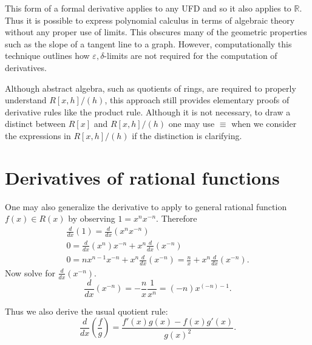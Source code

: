 \documentclass[12pt]{article}
\begin{document}
This form of a formal derivative applies to any UFD and so it also applies to $\mathbb{R}$.  Thus it is possible to express polynomial calculus in terms of algebraic theory without any proper use of limits.  This obscures many of the geometric properties such as the slope of a tangent line to a graph.  However, computationally this technique outlines how $\varepsilon,\delta$-limits are not required for the computation of derivatives.  

Although abstract algebra, such as quotients of rings, are required to properly understand $R[x,h]/(h)$, this approach still provides elementary proofs of derivative rules like the product rule.  Although it is not necessary, to draw a distinct between $R[x]$ and $R[x,h]/(h)$ one may use $\equiv$ when we consider the expressions in $R[x,h]/(h)$ if the distinction is clarifying.

\section{Derivatives of rational functions}

One may also generalize the derivative to apply to general rational function $f(x)\in R(x)$
by observing $1=x^n x^{-n}$. Therefore
\begin{gather*}
\frac{d}{dx}(1) = \frac{d}{dx}(x^n x^{-n})\\
0 = \frac{d}{dx}(x^n) x^{-n}+x^n \frac{d}{dx}(x^{-n})\\
0 = nx^{n-1} x^{-n}+x^n\frac{d}{dx}(x^{-n})
 = \frac{n}{x}+x^n\frac{d}{dx}(x^{-n}).
\end{gather*}
Now solve for $\frac{d}{dx}(x^{-n})$.
\[\frac{d}{dx}(x^{-n})=-\frac{n}{x}\frac{1}{x^n}=(-n)x^{(-n)-1}.\]

Thus we also derive the usual quotient rule:
\[\frac{d}{dx}\left(\frac{f}{g}\right) =
\frac{f'(x)g(x)-f(x)g'(x)}{g(x)^2}.\]

\end{document}
